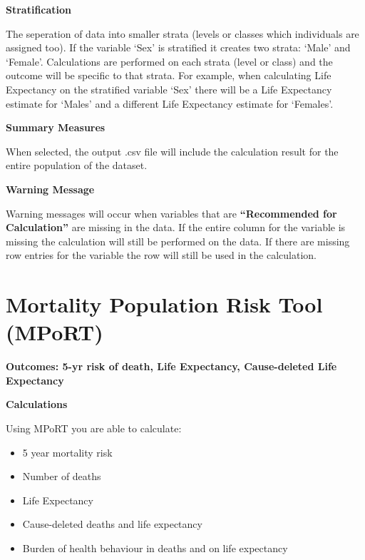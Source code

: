 \documentclass[]{book}
\providecommand{\tightlist}{%
  \setlength{\itemsep}{0pt}\setlength{\parskip}{0pt}}
\begin{document}
\textbf{Stratification}

The seperation of data into smaller strata (levels or
classes which individuals are assigned too). If the variable `Sex' is
stratified it creates two strata: `Male' and `Female'. Calculations are
performed on each strata (level or class) and the outcome will be
specific to that strata. For example, when calculating Life Expectancy
on the stratified variable `Sex' there will be a Life Expectancy
estimate for `Males' and a different Life Expectancy estimate for
`Females'.

\textbf{Summary Measures}

When selected, the output .csv file will include the calculation result
for the entire population of the dataset.

\textbf{Warning Message}

Warning messages will occur when variables that are
\textbf{``Recommended for Calculation''} are missing in the data. If the
entire column for the variable is missing the calculation will still be
performed on the data. If there are missing row entries for the variable
the row will still be used in the calculation.

























\appendix


\chapter{Mortality Population Risk Tool
(MPoRT)}\label{mortality-population-risk-tool-mport}

\textbf{Outcomes: 5-yr risk of death, Life Expectancy, Cause-deleted
Life Expectancy}

\textbf{Calculations}

Using MPoRT you are able to calculate:

\begin{itemize}
\tightlist
\item
  5 year mortality risk
\item
  Number of deaths
\item
  Life Expectancy
\item
  Cause-deleted deaths and life expectancy
\item
  Burden of health behaviour in deaths and on life expectancy
\end{itemize}
\end{document}

